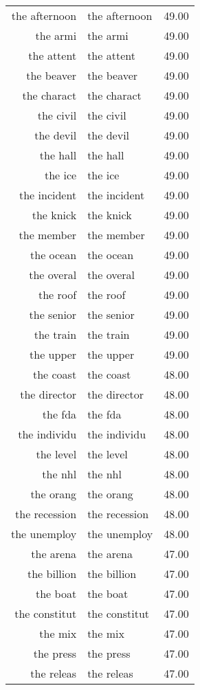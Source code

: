 \begin{table}[ht]
\begin{tabular}{rlr}
  the afternoon & the afternoon & 49.00 \\ 
  the armi & the armi & 49.00 \\ 
  the attent & the attent & 49.00 \\ 
  the beaver & the beaver & 49.00 \\ 
  the charact & the charact & 49.00 \\ 
  the civil & the civil & 49.00 \\ 
  the devil & the devil & 49.00 \\ 
  the hall & the hall & 49.00 \\ 
  the ice & the ice & 49.00 \\ 
  the incident & the incident & 49.00 \\ 
  the knick & the knick & 49.00 \\ 
  the member & the member & 49.00 \\ 
  the ocean & the ocean & 49.00 \\ 
  the overal & the overal & 49.00 \\ 
  the roof & the roof & 49.00 \\ 
  the senior & the senior & 49.00 \\ 
  the train & the train & 49.00 \\ 
  the upper & the upper & 49.00 \\ 
  the coast & the coast & 48.00 \\ 
  the director & the director & 48.00 \\ 
  the fda & the fda & 48.00 \\ 
  the individu & the individu & 48.00 \\ 
  the level & the level & 48.00 \\ 
  the nhl & the nhl & 48.00 \\ 
  the orang & the orang & 48.00 \\ 
  the recession & the recession & 48.00 \\ 
  the unemploy & the unemploy & 48.00 \\ 
  the arena & the arena & 47.00 \\ 
  the billion & the billion & 47.00 \\ 
  the boat & the boat & 47.00 \\ 
  the constitut & the constitut & 47.00 \\ 
  the mix & the mix & 47.00 \\ 
  the press & the press & 47.00 \\ 
  the releas & the releas & 47.00 \\ 

\end{tabular}
\end{table}
